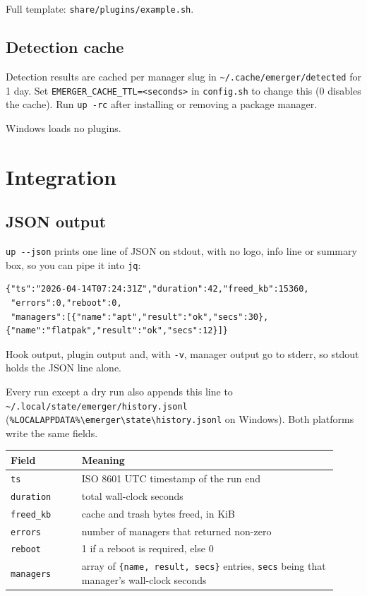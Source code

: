 \documentclass[11pt,a4paper]{article}
\begin{document}
Full template: \texttt{share/plugins/example.sh}.

\subsection{Detection cache}
Detection results are cached per manager slug in
\verb|~/.cache/emerger/detected| for 1 day. Set
\texttt{EMERGER\_CACHE\_TTL=<seconds>} in \texttt{config.sh} to change
this (0 disables the cache). Run \texttt{up -rc} after installing or
removing a package manager.

Windows loads no plugins.

\section{Integration}\label{sec:integration}

\subsection{JSON output}
\texttt{up -{}-json} prints one line of JSON on stdout, with no logo, info
line or summary box, so you can pipe it into \texttt{jq}:

\begin{lstlisting}[language=jsonplus]
{"ts":"2026-04-14T07:24:31Z","duration":42,"freed_kb":15360,
 "errors":0,"reboot":0,
 "managers":[{"name":"apt","result":"ok","secs":30},{"name":"flatpak","result":"ok","secs":12}]}
\end{lstlisting}

Hook output, plugin output and, with \texttt{-v}, manager output go to
stderr, so stdout holds the JSON line alone.

Every run except a dry run also appends this line to
\verb|~/.local/state/emerger/history.jsonl|
(\verb|%LOCALAPPDATA%\emerger\state\history.jsonl| on Windows). Both
platforms write the same fields.

\begin{center}
\begin{tabular}{@{}p{0.20\linewidth} p{0.72\linewidth}@{}}
\toprule
\textbf{Field}        & \textbf{Meaning} \\
\midrule
\texttt{ts}           & ISO 8601 UTC timestamp of the run end \\
\texttt{duration}     & total wall-clock seconds \\
\texttt{freed\_kb}    & cache and trash bytes freed, in KiB \\
\texttt{errors}       & number of managers that returned non-zero \\
\texttt{reboot}       & 1 if a reboot is required, else 0 \\
\texttt{managers}     & array of \texttt{\{name, result, secs\}} entries, \texttt{secs} being that manager's wall-clock seconds \\
\bottomrule
\end{tabular}
\end{center}
\end{document}
